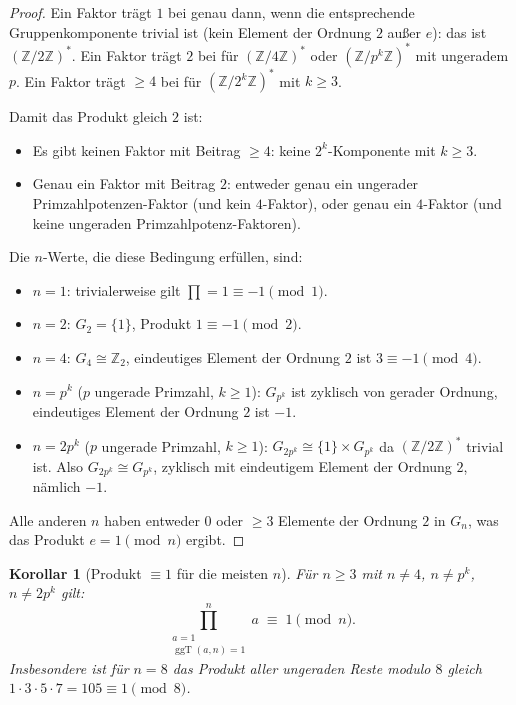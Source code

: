 \documentclass[12pt,a4paper]{amsart}
\newtheorem{korollar}[theorem]{Korollar}
\theoremstyle{definition}
\newcommand{\Z}{\mathbb{Z}}
\DeclareMathOperator{\ggT}{ggT}
\begin{document}
\begin{proof}
  Ein Faktor trägt $1$ bei genau dann, wenn die entsprechende Gruppenkomponente
  trivial ist (kein Element der Ordnung $2$ außer $e$): das ist $(\Z/2\Z)^*$.
  Ein Faktor trägt $2$ bei für $(\Z/4\Z)^*$ oder $(\Z/p^k\Z)^*$ mit ungeradem $p$.
  Ein Faktor trägt $\geq 4$ bei für $(\Z/2^k\Z)^*$ mit $k \geq 3$.

  Damit das Produkt gleich $2$ ist:
  \begin{itemize}
    \item Es gibt keinen Faktor mit Beitrag $\geq 4$: keine $2^k$-Komponente
      mit $k \geq 3$.
    \item Genau ein Faktor mit Beitrag $2$: entweder genau ein ungerader
      Primzahlpotenzen-Faktor (und kein $4$-Faktor), oder genau ein $4$-Faktor
      (und keine ungeraden Primzahlpotenz-Faktoren).
  \end{itemize}

  Die $n$-Werte, die diese Bedingung erfüllen, sind:
  \begin{itemize}
    \item $n = 1$: trivialerweise gilt $\prod = 1 \equiv -1 \pmod{1}$.
    \item $n = 2$: $G_2 = \{1\}$, Produkt $1 \equiv -1 \pmod{2}$.
    \item $n = 4$: $G_4 \cong \Z_2$, eindeutiges Element der Ordnung $2$ ist
      $3 \equiv -1 \pmod{4}$. \checkmark
    \item $n = p^k$ ($p$ ungerade Primzahl, $k \geq 1$): $G_{p^k}$ ist zyklisch
      von gerader Ordnung, eindeutiges Element der Ordnung $2$ ist $-1$. \checkmark
    \item $n = 2p^k$ ($p$ ungerade Primzahl, $k \geq 1$): $G_{2p^k} \cong
      \{1\} \times G_{p^k}$ da $(\Z/2\Z)^*$ trivial ist. Also $G_{2p^k} \cong
      G_{p^k}$, zyklisch mit eindeutigem Element der Ordnung $2$, nämlich $-1$. \checkmark
  \end{itemize}

  Alle anderen $n$ haben entweder $0$ oder $\geq 3$ Elemente der Ordnung $2$
  in $G_n$, was das Produkt $e = 1 \pmod{n}$ ergibt. \qedhere
\end{proof}

\begin{korollar}[Produkt $\equiv 1$ für die meisten $n$]\label{kor:produkt_eins}
  Für $n \geq 3$ mit $n \neq 4$, $n \neq p^k$, $n \neq 2p^k$ gilt:
  \[
    \prod_{\substack{a=1\\\ggT(a,n)=1}}^{n} a \;\equiv\; 1 \pmod{n}.
  \]
  Insbesondere ist für $n = 8$ das Produkt aller ungeraden Reste modulo $8$
  gleich $1 \cdot 3 \cdot 5 \cdot 7 = 105 \equiv 1 \pmod{8}$.
\end{korollar}
\end{document}
